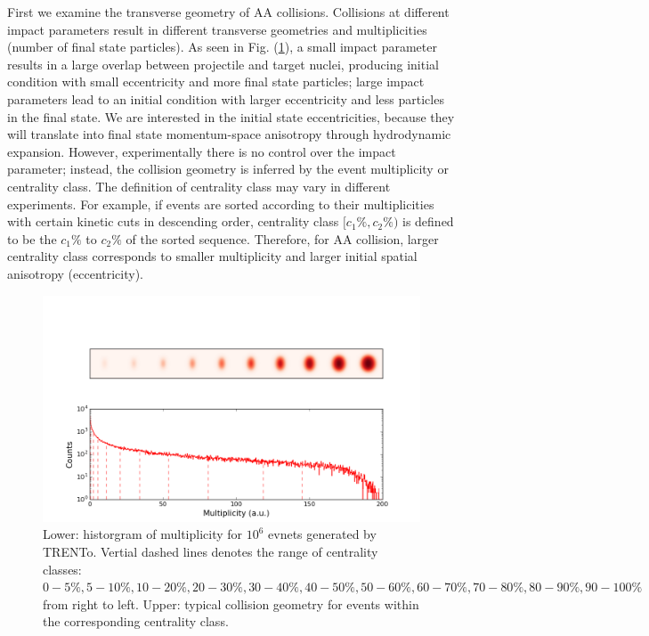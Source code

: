 \documentclass[aps,prl,twocolumn,groupedaddress]{revtex4-1}
\begin{document}
	First we examine the transverse geometry of AA collisions. Collisions at different impact parameters result in different transverse geometries and multiplicities (number of final state particles). 
	As seen in Fig. (\ref{centrality}), a small impact parameter results in a large overlap between projectile and target nuclei, producing initial condition with small eccentricity and more final state particles; large impact parameters lead to an initial condition with larger eccentricity and less particles in the final state. 
	We are interested in the initial state eccentricities, because they will translate into final state momentum-space anisotropy through hydrodynamic expansion.
	However, experimentally there is no control over the impact parameter; instead, the collision geometry is inferred by the event multiplicity or centrality class.
	The definition of centrality class may vary in different experiments.
	For example, if events are sorted according to their multiplicities with certain kinetic cuts in descending order, centrality class $[c_1\%, c_2\%)$ is defined to be the $c_1\%$ to $c_2\%$ of the sorted sequence.
	Therefore, for AA collision, larger centrality class corresponds to smaller multiplicity and larger initial spatial anisotropy (eccentricity).
	\begin{center}
	\begin{figure}
	\includegraphics[width=\columnwidth]{pics/centrality.png}
	\caption{Lower: historgram of multiplicity for $10^6$ evnets generated by TRENTo. Vertial dashed lines denotes the range of centrality classes: $0 - 5\%, 5 - 10\%, 10 - 20\%, 20 - 30\%, 30 - 40\%, 40 - 50\%, 50 - 60\%, 60 - 70\%, 70 - 80\%, 80 - 90\%, 90 - 100\%$ from right to left. Upper: typical collision geometry for events within the corresponding centrality class.}\label{centrality}
	\end{figure}
	\end{center}		
	
\end{document}
